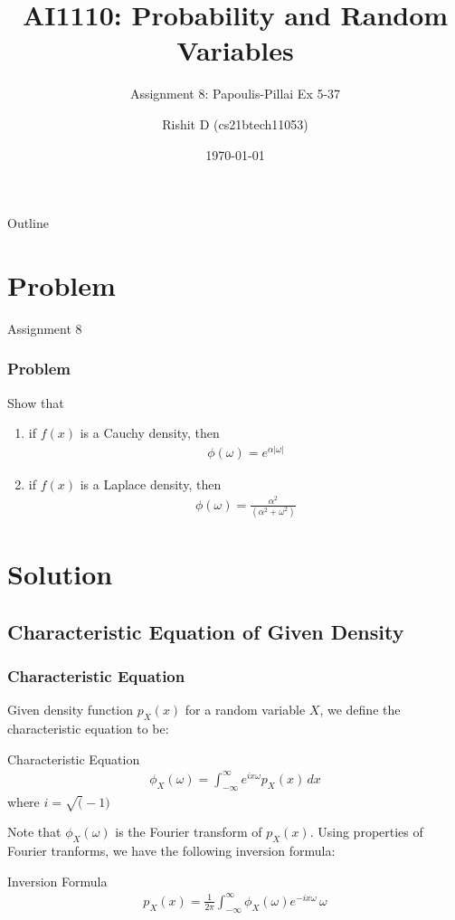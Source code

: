 \documentclass{beamer}
\title{AI1110: Probability and Random Variables}
\subtitle{Assignment 8: Papoulis-Pillai Ex 5-37}
\author{Rishit D (cs21btech11053)}
\institute{IIT Hyderabad}
\date{\today}
\begin{document}
\begin{frame}
    \titlepage 
\end{frame}

\begin{frame}{Outline}
    \tableofcontents
\end{frame}

\section{Problem}

\begin{frame}{Assignment 8}
  \frametitle{Problem}
  Show that
  \begin{enumerate}
  \item if $f(x)$ is a Cauchy density, then
    \begin{align}
      \phi(\omega) = e^{\alpha|\omega|}
      \label{eq:CauchChar}
    \end{align}
  \item if $f(x)$ is a Laplace density, then
    \begin{align}
      \phi(\omega) = \frac{\alpha^2}{(\alpha^2 + \omega^2)}
      \label{eq:LapChar}
    \end{align}
  \end{enumerate}
\end{frame}

\section{Solution}
\subsection{Characteristic Equation of Given Density}
\begin{frame}
  \frametitle{Characteristic Equation}
  Given density function $p_X(x)$ for a random variable $X$, we define the characteristic equation to be:
  \begin{block}{Characteristic Equation}
    \begin{align}
      \phi_X(\omega) = \int_{-\infty}^{\infty} e^{ix\omega} p_X(x) \,dx
      \label{eq:CharEqn}
    \end{align}
    where $i = \sqrt(-1)$
  \end{block}

  Note that $\phi_X(\omega)$ is the Fourier transform of $p_X(x)$. Using properties of Fourier tranforms, we have the following inversion formula:
  \begin{block}{Inversion Formula}
    \begin{align}
      p_X(x) = \frac{1}{2\pi} \int_{-\infty}^{\infty} \phi_X(\omega) e^{-ix\omega}\,\omega
      \label{eq:InvEqn}
    \end{align}
  \end{block}
\end{frame}
\end{document}
